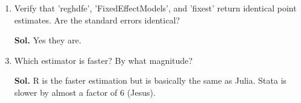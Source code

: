 \documentclass[12pt,oneside,reqno]{amsart}
\begin{document}
\begin{enumerate}[leftmargin=*,label=\textbf{(\roman*)}]
    \item Verify that 'reghdfe', 'FixedEffectModels', and 'fixest' return identical point estimates. Are the standard errors identical?
    \item[\textbf{Sol.}] Yes they are. 
    \item Which estimator is faster? By what magnitude?
    \item[\textbf{Sol.}] R is the faster estimation but is basically the same as Julia. Stata is slower by almost a factor of 6 (Jesus). 
\end{enumerate}
\end{document}
